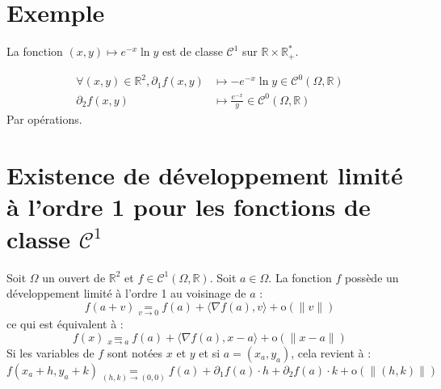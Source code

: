 \documentclass[../main.tex]{subfiles}
\begin{document}
\section{Exemple}
\begin{tcolorbox}[title=Exemple 36.35, title filled=false, colframe=darkgreen, colback=darkgreen!10!white]
    La fonction $(x, y)\mapsto e^{-x}\ln y$ est de classe $\mathcal{C}^1$ sur $\mathbb{R} \times \mathbb{R}_+^*$. 
\end{tcolorbox}

\begin{align*}
    \forall (x, y)\in \mathbb{R}^2, \partial_1f(x, y) &\mapsto -e^{-x}\ln y \in \mathcal{C}^0(\Omega, \mathbb{R}) \\
    \partial_2f(x, y) &\mapsto \frac{e^{-x}}{y} \in \mathcal{C}^0(\Omega, \mathbb{R})
\end{align*}
Par opérations. 

\section{Existence de développement limité à l'ordre 1 pour les fonctions de classe $\mathcal{C}^1$}
\begin{tcolorbox}[title=Théorème 36.38, title filled=false, colframe=orange, colback=orange!10!white]
    Soit $\Omega$ un ouvert de $\mathbb{R}^2$ et $f \in \mathcal{C}^1(\Omega, \mathbb{R})$. Soit $a \in \Omega$. La fonction $f$ possède un développement limité à l'ordre 1 au voisinage de $a$ :
    $$f(a+v) \underset{v \rightarrow 0}{=} f(a)+\langle\nabla f(a), v\rangle+\mathrm{o}(\|v\|)$$
    ce qui est équivalent à :
    $$f(x) \underset{x \rightarrow a}{=} f(a)+\langle\nabla f(a), x-a\rangle+\mathrm{o}(\|x-a\|)$$
    Si les variables de $f$ sont notées $x$ et $y$ et si $a=\left(x_a, y_a\right)$, cela revient à :
    $$f\left(x_a+h, y_a+k\right) \underset{(h, k) \rightarrow(0,0)}{=} f(a)+\partial_1 f(a) \cdot h+\partial_2 f(a) \cdot k+\mathrm{o}(\|(h, k)\|)$$
\end{tcolorbox}
\end{document}
